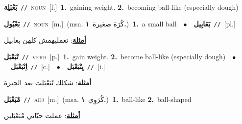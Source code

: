 \documentclass[10pt,a4paper,twoside]{article} %
\begin{document}
\begin{multicols}{2}
{\setlength\topsep{0pt}\textbf{\foreignlanguage{arabic}{بَعْبَلِة}}\ {\color{gray}\texttt{//}\color{black}}\ \textsc{noun}\ [f.]\ \textbf{1.}~gaining weight.  \textbf{2.}~becoming ball-like (especially dough)\ } \vspace{2mm}

{\setlength\topsep{0pt}\textbf{\foreignlanguage{arabic}{بَعْبُول}}\ {\color{gray}\texttt{//}\color{black}}\ \textsc{noun}\ [m.]\ \color{gray}(msa. \foreignlanguage{arabic}{كُرَة صغيرة}~\foreignlanguage{arabic}{\textbf{١.}})\color{black}\ \textbf{1.}~a small ball\ \ $\bullet$\ \ \setlength\topsep{0pt}\textbf{\foreignlanguage{arabic}{بَعَابِيل}}\ {\color{gray}\texttt{//}\color{black}}\ [pl.]\  \begin{flushright}\color{gray}\foreignlanguage{arabic}{\textbf{\underline{\foreignlanguage{arabic}{أمثلة}}}: تعمليهمش كلهن بعابيل}\end{flushright}\color{black}} \vspace{2mm}

{\setlength\topsep{0pt}\textbf{\foreignlanguage{arabic}{تْبَعْبَل}}\ {\color{gray}\texttt{//}\color{black}}\ \textsc{verb}\ [p.]\ \textbf{1.}~gain weight.  \textbf{2.}~become ball-like (especially dough)\ \ $\bullet$\ \ \setlength\topsep{0pt}\textbf{\foreignlanguage{arabic}{اِتْبَعْبَل}}\ {\color{gray}\texttt{//}\color{black}}\ [c.]\ \ $\bullet$\ \ \setlength\topsep{0pt}\textbf{\foreignlanguage{arabic}{يِتْبَعْبَل}}\ {\color{gray}\texttt{//}\color{black}}\ [i.]\  \begin{flushright}\color{gray}\foreignlanguage{arabic}{\textbf{\underline{\foreignlanguage{arabic}{أمثلة}}}: شكلك تْبَعْبَلت بعد الجيزة}\end{flushright}\color{black}} \vspace{2mm}

{\setlength\topsep{0pt}\textbf{\foreignlanguage{arabic}{مْبَعْبَل}}\ {\color{gray}\texttt{//}\color{black}}\ \textsc{adj}\ [m.]\ \color{gray}(msa. \foreignlanguage{arabic}{كُرَوِي}~\foreignlanguage{arabic}{\textbf{١.}})\color{black}\ \textbf{1.}~ball-like  \textbf{2.}~ball-shaped\  \begin{flushright}\color{gray}\foreignlanguage{arabic}{\textbf{\underline{\foreignlanguage{arabic}{أمثلة}}}: عملت حبّاتي مْبَعْبَلين}\end{flushright}\color{black}} \vspace{2mm}


\end{multicols}
\end{document}
